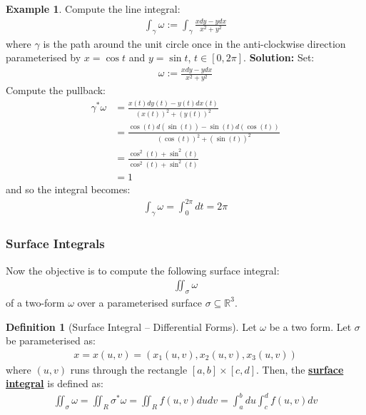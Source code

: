 \documentclass[11pt]{scrartcl}
\newcommand{\R}[0]{\mathbb{R}}
\theoremstyle{definition}
\newtheorem{definition}{Definition}
\newtheorem{ex}{Example}
\theoremstyle{remark}
\newcommand{\dfn}[1]{\textbf{\underline{#1}}}
\newcommand{\idx}[2]{\int_{#1}^{#2}}
\begin{document}
{\begin{ex}
	Compute the line integral: 
	\begin{align*}
		\idx{\gamma}{} \omega := \idx{\gamma}{} \frac{xdy - ydx}{x^2 + y^2}
	\end{align*}
	where $\gamma$ is the path around the unit circle once in the anti-clockwise direction parameterised by $x = \cos t$ and $ y = \sin t$, $t \in [0, 2 \pi ]$. 
	\newline
	\newline
	\textbf{Solution:} Set: 
	\begin{align*}
		\omega := \frac{xdy - ydx}{x^2 + y^2}
	\end{align*}
	Compute the pullback: 
	\begin{align*}
		\gamma^* \omega & = \frac{x(t) dy(t) - y(t) dx(t)}{(x(t))^2 + (y(t))^2} \\
		& = \frac{\cos (t) d ( \sin(t)) - \sin (t) d ( \cos(t)) }{( \cos(t))^2 + ( \sin(t))^2} \\
		& = \frac{\cos^2(t) + \sin^2(t)}{\cos^2(t) + \sin^2(t)} \\
		& = 1
	\end{align*}
	and so the integral becomes: 
	\begin{align*}
		\idx{\gamma}{} \omega = \idx{0}{2 \pi} dt = 2 \pi 
	\end{align*}
\end{ex}

\subsubsection{Surface Integrals}
Now the objective is to compute the following surface integral: 
\begin{align*}
	\iint_\sigma \omega 
\end{align*}
of a two-form $\omega$ over a parameterised surface $\sigma \subseteq \R^3$. 

\begin{definition}[Surface Integral -- Differential Forms]
	Let $\omega$ be a two form. Let $\sigma$ be parameterised as: 
	\begin{align*}
		x = x(u,v) = (x_1(u,v), x_2(u,v), x_3(u,v)) 
	\end{align*}
	where $(u,v)$ runs through the rectangle $[a,b] \times [c,d]$. Then, the \dfn{surface integral} is defined as: 
	\begin{align}
		\iint_\sigma \omega = \iint_R \sigma^* \omega = \iint_R f(u,v) du dv = \idx{a}{b} du \idx{c}{d} f(u,v) dv 	
	\end{align}
\end{definition}

}
\end{document}
